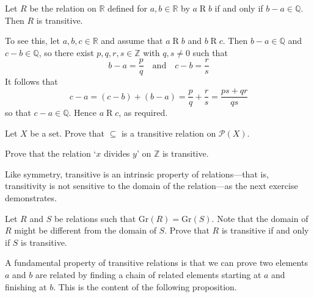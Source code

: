 \begin{example}
\label{exDifferenceOfRealsInQIsTransitive}
Let $R$ be the relation on $\mathbb{R}$ defined for $a,b \in \mathbb{R}$ by $a \mathrel{R} b$ if and only if $b-a \in \mathbb{Q}$. Then $R$ is transitive.

To see this, let $a,b,c \in \mathbb{R}$ and assume that $a \mathrel{R} b$ and $b \mathrel{R} c$. Then $b-a \in \mathbb{Q}$ and $c-b \in \mathbb{Q}$, so there exist $p,q,r,s \in \mathbb{Z}$ with $q,s \ne 0$ such that
\[ b-a = \dfrac{p}{q} \quad \text{and} \quad c-b = \dfrac{r}{s} \]
It follows that 
\[ c-a = (c-b) + (b-a) = \dfrac{p}{q} + \dfrac{r}{s} = \dfrac{ps+qr}{qs} \]
so that $c-a \in \mathbb{Q}$. Hence $a \mathrel{R} c$, as required.
\end{example}

\begin{exercise}
Let $X$ be a set. Prove that $\subseteq$ is a transitive relation on $\mathcal{P}(X)$.
\end{exercise}

\begin{exercise}
\label{exDivisibilityIsTransitive}
Prove that the relation `$x$ divides $y$' on $\mathbb{Z}$ is transitive.
\end{exercise}

Like symmetry, transitive is an intrinsic property of relations---that is, transitivity is not sensitive to the domain of the relation---as the next exercise demonstrates.

\begin{exercise}
\label{exTransitivityNotSensitiveToDomainOfRelation}
Let $R$ and $S$ be relations such that $\mathrm{Gr}(R) = \mathrm{Gr}(S)$. Note that the domain of $R$ might be different from the domain of $S$. Prove that $R$ is transitive if and only if $S$ is transitive.
\end{exercise}

A fundamental property of transitive relations is that we can prove two elements $a$ and $b$ are related by finding a chain of related elements starting at $a$ and finishing at $b$. This is the content of the following proposition.

